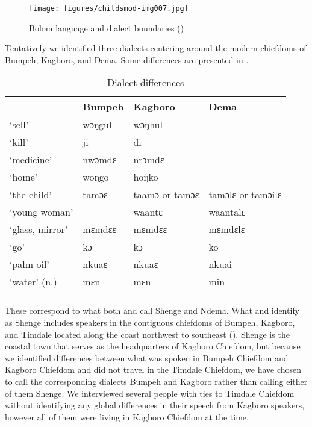 \begin{figure}
\caption{Bolom language and dialect boundaries (\citealt{IversonCameron1986})}
\label{fig:intro:7}
\texttt{[image: figures/childsmod-img007.jpg]}
\end{figure}

Tentatively we identified three dialects centering around the modern chiefdoms of Bumpeh, Kagboro, and Dema. Some differences are presented in . 

\begin{table}
\caption{\label{tab:intro:2}Dialect differences}

\begin{tabularx}{\textwidth}{QQQl}
\lsptoprule
& Bumpeh & Kagboro & Dema\\
\midrule
‘sell' & wɔŋgul & wɔŋhul & \\
‘kill'  & ji & di & \\
‘medicine'  & nwɔmdɛ & nrɔmdɛ & \\
‘home'  & woŋgo & hoŋko & \\
‘the child'  & tamɔɛ & taamɔ or tamɔɛ & tamɔlɛ or tamɔilɛ\\
‘young woman' & & waantɛ & waantalɛ\\
‘glass, mirror' & mɛmdɛɛ & mɛmdɛɛ & mɛmdɛlɛ\\
‘go' & kɔ & kɔ & ko\\
‘palm oil' & nkuaɛ & nkuaɛ & nkuai\\
‘water' (n.) & mɛn & mɛn & min\\
\lspbottomrule
\end{tabularx}
\end{table}

These correspond to what both \citet{Hanson1979a} and \citet{IversonCameron1986} call Shenge and Ndema. What \citet{Hanson1979a} and \citet{IversonCameron1986} identify as Shenge includes speakers in the contiguous chiefdoms of Bumpeh, Kagboro, and Timdale located along the coast northwest to southeast (). Shenge is the coastal town that serves as the headquarters of Kagboro Chiefdom, but because we identified differences between what was spoken in Bumpeh Chiefdom and Kagboro Chiefdom and did not travel in the Timdale Chiefdom, we have chosen to call the corresponding dialects Bumpeh and Kagboro rather than calling either of them Shenge. We interviewed several people with ties to Timdale Chiefdom without identifying any global differences in their speech from Kagboro speakers, however all of them were living in Kagboro Chiefdom at the time. 


